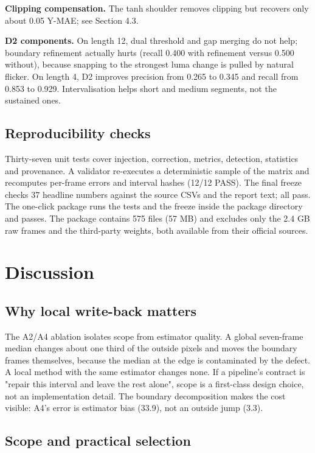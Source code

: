 \documentclass[twocolumn,10pt]{svjour3}
\begin{document}
\textbf{Clipping compensation.} The tanh shoulder removes clipping but recovers only about 0.05 Y-MAE; see Section 4.3.


\textbf{D2 components.} On length 12, dual threshold and gap merging do not help; boundary refinement actually hurts (recall 0.400 with refinement versus 0.500 without), because snapping to the strongest luma change is pulled by natural flicker. On length 4, D2 improves precision from 0.265 to 0.345 and recall from 0.853 to 0.929. Intervalisation helps short and medium segments, not the sustained ones.


\subsection{Reproducibility checks}

Thirty-seven unit tests cover injection, correction, metrics, detection, statistics and provenance. A validator re-executes a deterministic sample of the matrix and recomputes per-frame errors and interval hashes (12/12 PASS). The final freeze checks 37 headline numbers against the source CSVs and the report text; all pass. The one-click package runs the tests and the freeze inside the package directory and passes. The package contains 575 files (57 MB) and excludes only the 2.4 GB raw frames and the third-party weights, both available from their official sources.


\section{Discussion}

\subsection{Why local write-back matters}

The A2/A4 ablation isolates scope from estimator quality. A global seven-frame median changes about one third of the outside pixels and moves the boundary frames themselves, because the median at the edge is contaminated by the defect. A local method with the same estimator changes none. If a pipeline's contract is "repair this interval and leave the rest alone", scope is a first-class design choice, not an implementation detail. The boundary decomposition makes the cost visible: A4's error is estimator bias (33.9), not an outside jump (3.3).


\subsection{Scope and practical selection}
\end{document}
